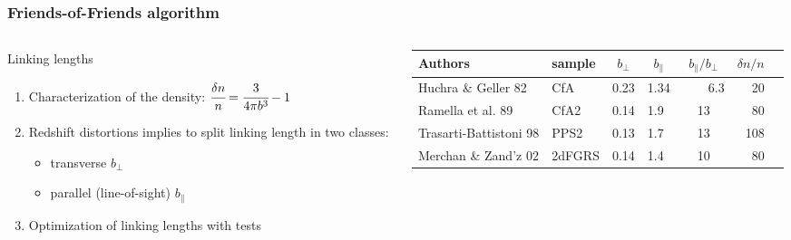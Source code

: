 \begin{frame}
    \frametitle{Friends-of-Friends algorithm}

    \begin{columns}
        \begin{column}{0.5\textwidth}
            \begin{block}{Linking lengths}
                \begin{enumerate}
                    \item<1-> Characterization of the density:
                        $\cfrac{\delta n}{n}=\cfrac{3}{4\pi b^3}-1$
                    \item<2-> Redshift distortions implies to split linking
                        length in two classes:
                        \begin{itemize}
                            \item transverse $b_\bot$
                            \item parallel (line-of-sight) $b_\parallel$
                        \end{itemize}
                    \item<3-> Optimization of linking lengths with tests
                \end{enumerate}
            \end{block}
        \end{column}
        \begin{column}{0.5\textwidth}
            \begin{adjustbox}{max width=\linewidth}
                \begin{tabular}{llllcrl}
                    \toprule%
                    \toprule%
                    Authors & sample & \multicolumn{1}{c}{$b_\perp$} &
                        \multicolumn{1}{c}{$b_\parallel$} &
                    \multicolumn{1}{c}{$b_\parallel/b_\perp$} & $\delta n/n$ \\
                    \toprule%
                    Huchra \& Geller 82     & CfA     & 0.23  & 1.34
                        & \ \ \ \ 6.3 & 20\\
                    Ramella et al. 89       & CfA2    & 0.14  & 1.9   & 13
                        & 80\\
                    Trasarti-Battistoni 98  & PPS2    & 0.13  & 1.7   & 13
                        & 108\\
                    Merchan \& Zand'z 02    & 2dFGRS  & 0.14  & 1.4   & 10
                        & 80\\

\end{tabular}
\end{adjustbox}
\end{column}
\end{columns}
\end{frame}
